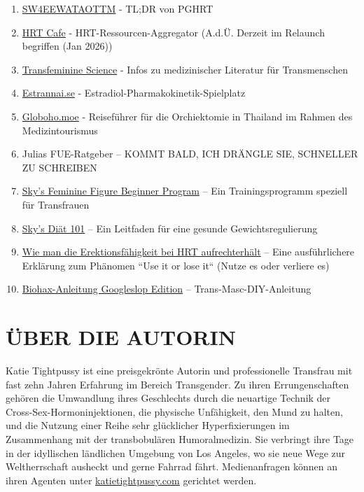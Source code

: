 \documentclass{article}
\begin{document}
\begin{enumerate}
  \item \href{https://startwith4mgestradiolenanthateweeklyandtestatonetothreemonths.com/}{SW4EEWATAOTTM} - TL;DR von PGHRT
  \item \href{https://hrtcafe.net/}{HRT Cafe} - HRT-Ressourcen-Aggregator (A.d.Ü. Derzeit im Relaunch begriffen (Jan 2026))
  \item \href{https://transfemscience.org/}{Transfeminine Science} - Infos zu medizinischer Literatur für Transmenschen
  \item \href{http://estrannai.se}{Estrannai.se} - Estradiol-Pharmakokinetik-Spielplatz
  \item \href{https://globoho.moe/}{Globoho.moe} - Reiseführer für die Orchiektomie in Thailand im Rahmen des Medizintourismus
  \item Julias FUE-Ratgeber – KOMMT BALD, ICH DRÄNGLE SIE, SCHNELLER ZU SCHREIBEN
  \item \href{https://docs.google.com/document/d/1-NyE5EY5TTaRRMhk7HlTbKJ7HifjEsA4jlDO1qKQVl0/edit?tab=t.0}{Sky's Feminine Figure Beginner Program} – Ein Trainingsprogramm speziell für Transfrauen
  \item \href{https://docs.google.com/document/d/114sztSw1aVWM2pXLDl9NrHklyvewz3EmFiHiisjM71k/edit?tab=t.0}{Sky's Diät 101} – Ein Leitfaden für eine gesunde Gewichtsregulierung
  \item \href{https://stainedglasswoman.substack.com/p/how-to-maintain-your-penis-function}{Wie man die Erektionsfähigkeit bei HRT aufrechterhält} – Eine ausführlichere Erklärung zum Phänomen “Use it or lose it“ (Nutze es oder verliere es)
  \item \href{hhttps://docs.google.com/document/d/1DXFxzN0XTudPZez_SO61fpqncRLPH_Be_QG_8Pcz9LU/edit?pli=1&tab=t.0}{Biohax-Anleitung Googleslop Edition} – Trans-Masc-DIY-Anleitung
\end{enumerate}

\section*{ÜBER DIE AUTORIN}

Katie Tightpussy ist eine preisgekrönte Autorin und professionelle Transfrau mit fast zehn Jahren Erfahrung im Bereich Transgender. Zu ihren Errungenschaften gehören die Umwandlung ihres Geschlechts durch die neuartige Technik der Cross-Sex-Hormoninjektionen, die physische Unfähigkeit, den Mund zu halten, und die Nutzung einer Reihe sehr glücklicher Hyperfixierungen im Zusammenhang mit der transbobulären Humoralmedizin. Sie verbringt ihre Tage in der idyllischen ländlichen Umgebung von Los Angeles, wo sie neue Wege zur Weltherrschaft ausheckt und gerne Fahrrad fährt. Medienanfragen können an ihren Agenten unter \href{http://katietightpussy.com}{katietightpussy.com} gerichtet werden.
\end{document}
